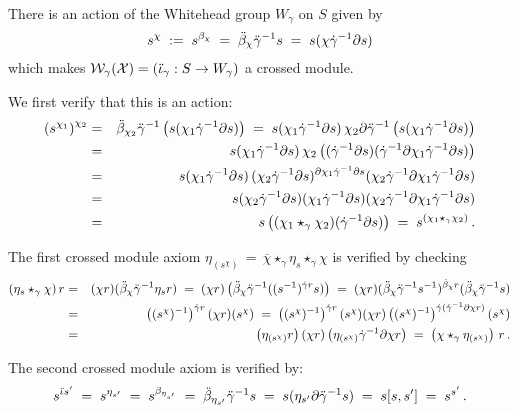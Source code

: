 \bigskip
\begin{lem} \label{lem:deriv-act}
There is an action of the Whitehead group $W_{\gamma}$ on $S$ given by
$$
s^{\chi} \;:=\; s^{\beta_{\chi}} 
          \;=\; \ddot{\beta}_{\chi} \ddot{\gamma}^{-1} s
          \;=\; s(\chi\dot{\gamma}^{-1}\partial s)
$$
which makes  $\mathcal{W}_{\gamma}(\mathcal{X}) = (\ddot{\iota}_{\gamma} : S \to W_{\gamma})$  
a crossed module.
\end{lem}
\begin{pf}
We first verify that this is an action:
\begin{eqnarray*} 
\left( s^{\chi_1} \right)^{\chi_2} 
  & = &  \ddot{\beta}_{\chi_2} \ddot{\gamma}^{-1} \left( s(\chi_1\dot{\gamma}^{-1}\partial s) \right) 
  \;=\;  s(\chi_1\dot{\gamma}^{-1}\partial s)\, 
         \chi_2\partial\ddot{\gamma}^{-1} \left( s(\chi_1\dot{\gamma}^{-1}\partial s) \right) \\ 
  & = &  s(\chi_1\dot{\gamma}^{-1}\partial s)\, 
         \chi_2\left( (\dot{\gamma}^{-1}\partial s)
                      (\dot{\gamma}^{-1}\partial\chi_1\dot{\gamma}^{-1}\partial s) \right) \\  
  & = &  s(\chi_1\dot{\gamma}^{-1}\partial s)\, 
         (\chi_2\dot{\gamma}^{-1}\partial s)^{\partial\chi_1\dot{\gamma}^{-1}\partial s} 
             (\chi_2\dot{\gamma}^{-1}\partial\chi_1\dot{\gamma}^{-1}\partial s)  \\
  & = &  s(\chi_2\dot{\gamma}^{-1}\partial s)(\chi_1\dot{\gamma}^{-1}\partial s)
             (\chi_2\dot{\gamma}^{-1}\partial\chi_1\dot{\gamma}^{-1}\partial s)  \\
  & = &  s \left( (\chi_1 \star_{\gamma} \chi_2)(\dot{\gamma}^{-1}\partial s) \right) 
  \;=\;  s^{(\chi_1 \star_{\gamma} \chi_2)} \,.
\end{eqnarray*} 

\noindent
The first crossed module axiom 
$\eta_{(s^{\chi})} \,=\, 
 \overline{\chi} \star_{\gamma} \eta_s \star_{\gamma} \chi$
is verified by checking 
\begin{eqnarray*} 
(\eta_s \star_{\gamma} \chi)\,r
  & = &  (\chi r)(\ddot{\beta}_{\chi} \ddot{\gamma}^{-1} \eta_s r) 
  \;=\;  (\chi r)\left(\ddot{\beta}_{\chi}\ddot{\gamma}^{-1}((s^{-1})^{\dot{\gamma} r}s)\right)  
  \;=\;  (\chi r)(\ddot{\beta}_{\chi}\ddot{\gamma}^{-1}s^{-1})^{\dot{\beta}_{\chi}r} 
           (\ddot{\beta}_{\chi}\ddot{\gamma}^{-1}s) \\
  & = &  \left((s^{\chi})^{-1}\right)^{\dot{\gamma} r}(\chi r)(s^{\chi}) 
  \;=\;  \left((s^{\chi})^{-1}\right)^{\dot{\gamma} r}
            (s^{\chi})(\chi r)
            \left((s^{\chi})^{-1}\right)^{\dot{\gamma}(\dot{\gamma}^{-1}\partial\chi r)} 
            (s^{\chi}) \\  
  & = &  \left(\eta_{(s^{\chi})}r\right)(\chi r)
           \left(\eta_{(s^{\chi})}\dot{\gamma}^{-1}\partial\chi r\right) 
  \;=\;  \left(\chi \star_{\gamma} \eta_{(s^{\chi})}\right)\,r\,.
\end{eqnarray*}

\noindent
The second crossed module axiom is verified by:
$$ 
s^{\ddot{\iota} s^{\prime}} 
  \;=\; s^{\eta_{s'}} 
  \;=\; s^{\beta_{\eta_{s'}}} 
  \;=\; \ddot{\beta}_{\eta_{s'}} \ddot{\gamma}^{-1} s 
  \;=\; s(\eta_{s'} \partial \ddot{\gamma}^{-1} s) 
  \;=\; s[s,s'] 
  \;=\; s^{s'}\,. 
$$ 
\end{pf}

